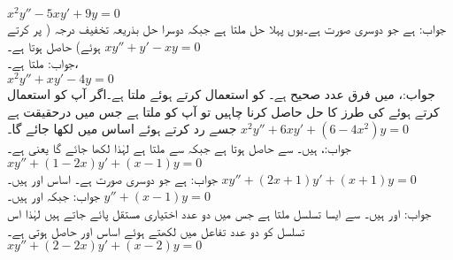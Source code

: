 \quad
$x^2y''-5xy'+9y=0$\\
جواب: ہے جو دوسری صورت ہے۔یوں پہلا حل   ملتا ہے جبکہ دوسرا حل بذریعہ تخفیف درجہ ( پر کرتے ہوئے)  حاصل ہوتا ہے۔ 
\quad
$xy''+y'-xy=0$\\
جواب: ملتا ہے۔، \\
\quad
$x^2y''+xy'-4y=0$\\
جواب:،  میں فرق عدد صحیح ہے۔ کو استعمال کرتے ہوئے  ملتا ہے۔اگر آپ  کو استعمال کرتے ہوئے   کی طرز کا حل حاصل کرنا چاہیں تو آپ کو  ملتا ہے جس میں  درحقیقت  ہے جسے رد کرتے ہوئے اساس میں  لکھا جائے گا۔  
\quad
$x^2y''+6xy'+(6-4x^2)y=0$\\
جواب:،  ہیں۔  سے   حاصل ہوتا ہے جبکہ  سے  ملتا ہے لہٰذا  لکھا جائے گا یعنی  ہے۔
\quad
$xy''+(1-2x)y'+(x-1)y=0$\\
جواب: ہے جو دوسری صورت ہے۔ اساس  اور  ہیں۔
\quad
$xy''+(2x+1)y'+(x+1)y=0$\\
جواب: جبکہ  اور  ہیں۔
\quad 
$y''+(x-1)y=0$\\
جواب: اور  ہیں۔  سے ایسا تسلسل ملتا ہے جس میں دو عدد اختیاری مستقل پائے جاتے ہیں لہٰذا اس تسلسل کو دو عدد تفاعل میں لکھتے ہوئے اساس  اور 
 حاصل ہوتی ہے۔
\quad
$xy''+(2-2x)y'+(x-2)y=0$\\
